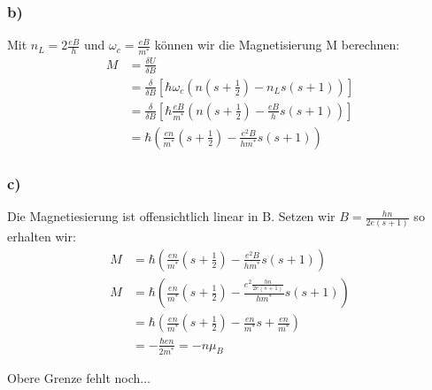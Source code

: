 \subsubsection*{b)}
Mit $n_L = 2\frac{eB}{h}$ und $\omega_c = \frac{eB}{m^*}$ können wir die Magnetisierung M berechnen:
\begin{align*}
M &= \frac{\delta U}{\delta B}\\
 &= \frac{\delta}{\delta B} \left[\hbar\omega_c\left(n\left(s+\frac 12\right)-n_L s(s+1)\right)\right] \\
 &= \frac{\delta}{\delta B} \left[\hbar\frac{eB}{m^*}\left(n\left(s+\frac 12\right)-\frac{eB}{h} s(s+1)\right)\right]\\
 &= \hbar\left(\frac{en}{m^*}\left(s+\frac 12\right)-\frac{e^2B}{hm^*} s(s+1)\right)
\end{align*}

\subsubsection*{c)}
Die Magnetiesierung ist offensichtlich linear in B. Setzen wir $B = \frac{hn}{2e(s+1)}$ so erhalten wir:
\begin{align*}
M &= \hbar\left(\frac{en}{m^*}\left(s+\frac 12\right)-\frac{e^2B}{hm^*} s(s+1)\right)\\
M &= \hbar\left(\frac{en}{m^*}\left(s+\frac 12\right)-\frac{e^2\frac{hn}{2e(s+1)}}{hm^*} s(s+1)\right) \\
&= \hbar\left(\frac{en}{m^*}\left(s+\frac 12\right) - \frac{en}{m^*}s+\frac{en}{m^*}\right)\\
&= -\frac{\hbar en}{2m^*} = -n \mu_B
\end{align*}

Obere Grenze fehlt noch...
